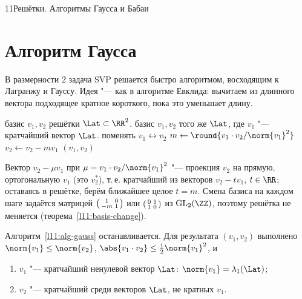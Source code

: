 \begin{lecture}{11}{Решётки. Алгоритмы Гаусса и Бабаи}

\section{Алгоритм Гаусса}\label{l11:sec-gauss}

В размерности $2$ задача SVP решается быстро алгоритмом, восходящим к Лагранжу и Гауссу.
Идея "--- как в алгоритме Евклида: вычитаем из длинного вектора подходящее кратное короткого,
пока это уменьшает длину.

\begin{algorithm}\label{l11:alg-gauss}
\begin{algorithmic}[1]
\Require базис $v_1, v_2$ решётки $\Lat \subset \RR^2$.
\Ensure базис $v_1, v_2$ того же $\Lat$, где $v_1$ "--- кратчайший вектор $\Lat$.
\Repeat
   \State поменять $v_1 \leftrightarrow v_2$ \EndIf
  \State $m \gets \round{v_1 \cdot v_2 / \norm{v_1}^2}$ 
  \State $v_2 \gets v_2 - m v_1$
\State \Return $(v_1, v_2)$
\end{algorithmic}
\end{algorithm}

Вектор $v_2 - \mu v_1$ при $\mu = v_1 \cdot v_2/\norm{v_1}^2$ "--- проекция $v_2$ на прямую,
ортогональную $v_1$ (это $v_2^*$), т.\,е. кратчайший из векторов $v_2 - t v_1$, $t \in \RR$;
оставаясь в решётке, берём ближайшее целое $t = m$. Смена базиса на каждом шаге задаётся
матрицей $\begin{psmallmatrix}1 & 0\\ -m & 1\end{psmallmatrix}$ или
$\begin{psmallmatrix}0 & 1\\ 1 & 0\end{psmallmatrix}$ из $\mathrm{GL}_2(\ZZ)$, поэтому решётка не
меняется (теорема~\ref{l11:basis-change}).

\begin{theorem}\label{l11:gauss}
Алгоритм~\ref{l11:alg-gauss} останавливается. Для результата $(v_1, v_2)$ выполнено
$\norm{v_1} \le \norm{v_2}$, $\abs{v_1 \cdot v_2} \le \frac12 \norm{v_1}^2$, и
\begin{enumerate}
  \item $v_1$ "--- кратчайший ненулевой вектор $\Lat$: $\norm{v_1} = \lambda_1(\Lat)$;
  \item $v_2$ "--- кратчайший среди векторов $\Lat$, не кратных $v_1$.
\end{enumerate}
\end{theorem}


\end{lecture}
